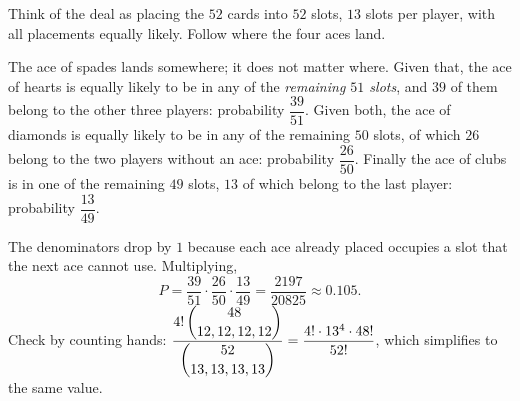 Think of the deal as placing the $52$ cards into $52$ slots, $13$ slots per player, with all placements equally likely. Follow where the four aces land.

The ace of spades lands somewhere; it does not matter where. Given that, the ace of hearts is equally likely to be in any of the \emph{remaining $51$ slots}, and $39$ of them belong to the other three players: probability $\dfrac{39}{51}$. Given both, the ace of diamonds is equally likely to be in any of the remaining $50$ slots, of which $26$ belong to the two players without an ace: probability $\dfrac{26}{50}$. Finally the ace of clubs is in one of the remaining $49$ slots, $13$ of which belong to the last player: probability $\dfrac{13}{49}$.

The denominators drop by $1$ because each ace already placed occupies a slot that the next ace cannot use. Multiplying,
\[
P=\dfrac{39}{51}\cdot\dfrac{26}{50}\cdot\dfrac{13}{49}=\boxed{\dfrac{2197}{20825}}\approx0.105 .
\]
Check by counting hands: $\dfrac{4!\,\dbinom{48}{12,12,12,12}}{\dbinom{52}{13,13,13,13}}=\dfrac{4!\cdot13^4\cdot48!}{52!}$, which simplifies to the same value.
